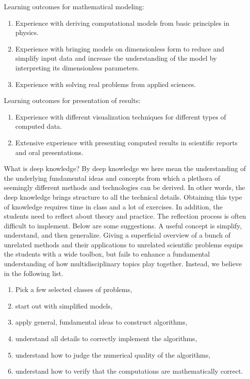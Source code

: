 \documentclass[%
oneside,                 %
final,                   %
10pt]{article}
\begin{document}
\noindent
Learning outcomes for mathematical modeling:
\begin{enumerate}
\item Experience with deriving computational models from basic principles in physics.

\item Experience with bringing models on dimensionless form to reduce and simplify input data and increase the understanding of the model by interpreting its dimensionless parameters.

\item Experience with solving real problems from applied sciences.
\end{enumerate}

\noindent
Learning outcomes for presentation of results:
\begin{enumerate}
\item Experience with different visualization techniques for different types of computed data.

\item Extensive experience with presenting computed results in scientific reports and oral presentations.
\end{enumerate}

\noindent
What is deep knowledge?
By deep knowledge we here mean the understanding of the underlying fundamental ideas and concepts from which a plethora of seemingly different methods and technologies can be derived. In other words, the deep knowledge brings structure to all the technical details.
Obtaining this type of knowledge requires time in class and a lot of exercises. In addition, the students need to reflect about theory and practice. The reflection process is often difficult to implement. Below are some suggestions.
A useful concept is simplify, understand, and then generalize. Giving a superficial overview of a bunch of unrelated methods and their applications to unrelated scientific problems equips the students with a wide toolbox, but fails to enhance a fundamental understanding of how multidisciplinary topics play together. Instead, we believe in the following list.
\begin{enumerate}
\item Pick a few selected classes of problems, 

\item start out with simplified models,

\item apply general, fundamental ideas to construct algorithms,

\item understand all details to correctly implement the algorithms,

\item understand how to judge the numerical quality of the algorithms,

\item understand how to verify that the computations are mathematically correct.
\end{enumerate}
\end{document}
